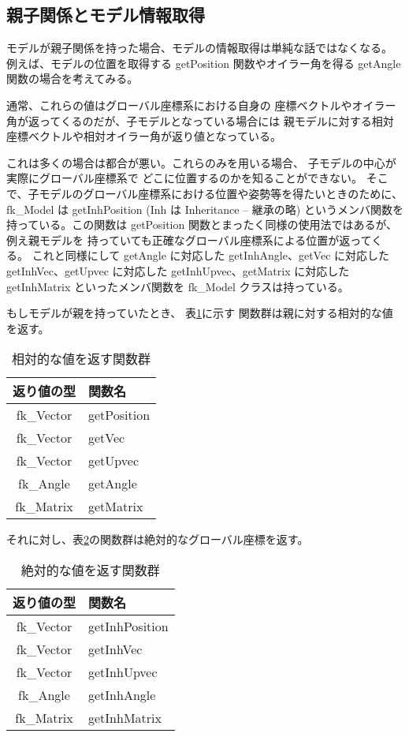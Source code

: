 \subsection{親子関係とモデル情報取得}
モデルが親子関係を持った場合、モデルの情報取得は単純な話ではなくなる。
例えば、モデルの位置を取得する getPosition 関数やオイラー角を得る
getAngle 関数の場合を考えてみる。

通常、これらの値はグローバル座標系における自身の
座標ベクトルやオイラー角が返ってくるのだが、子モデルとなっている場合には
親モデルに対する相対座標ベクトルや相対オイラー角が返り値となっている。

これは多くの場合は都合が悪い。これらのみを用いる場合、
子モデルの中心が実際にグローバル座標系で
どこに位置するのかを知ることができない。
そこで、子モデルのグローバル座標系における位置や姿勢等を得たいときのために、
fk\_Model は getInhPosition (Inh は Inheritance -- 継承の略)
というメンバ関数を持っている。この関数は
getPosition 関数とまったく同様の使用法ではあるが、例え親モデルを
持っていても正確なグローバル座標系による位置が返ってくる。
これと同様にして getAngle に対応した
getInhAngle、getVec に対応した getInhVec、getUpvec に対応した
getInhUpvec、getMatrix に対応した getInhMatrix といったメンバ関数を
fk\_Model クラスは持っている。

もしモデルが親を持っていたとき、
表\ref{tbl:fkInh1}に示す
関数群は親に対する相対的な値を返す。

\begin{table}[H]
\caption{相対的な値を返す関数群}
\label{tbl:fkInh1}
\begin{center}
\begin{tabular}{|c|l|}
\hline
返り値の型 & 関数名 \\ \hline \hline
fk\_Vector & getPosition \\ \hline
fk\_Vector & getVec \\ \hline
fk\_Vector & getUpvec \\ \hline
fk\_Angle & getAngle \\ \hline
fk\_Matrix & getMatrix \\ \hline
\end{tabular}
\end{center}
\end{table}

それに対し、表\ref{tbl:fkInh2}の関数群は絶対的なグローバル座標を返す。

\begin{table}[H]
\caption{絶対的な値を返す関数群}
\label{tbl:fkInh2}
\begin{center}
\begin{tabular}{|c|l|}
\hline
返り値の型 & 関数名 \\ \hline \hline
fk\_Vector & getInhPosition \\ \hline
fk\_Vector & getInhVec \\ \hline
fk\_Vector & getInhUpvec \\ \hline
fk\_Angle & getInhAngle \\ \hline
fk\_Matrix & getInhMatrix \\ \hline
\end{tabular}
\end{center}
\end{table}


